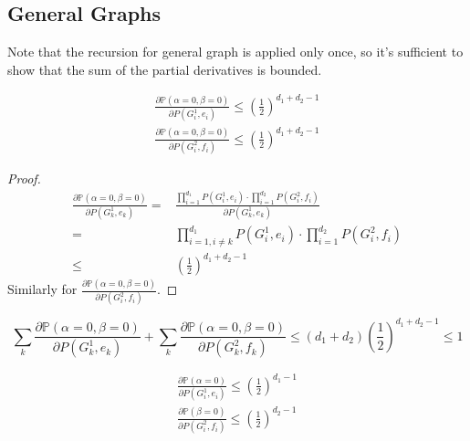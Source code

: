 	\subsection{General Graphs}

	Note that the recursion for general graph is applied only once, so it's sufficient to show that the sum of the partial derivatives is bounded.

	\begin{Prop}
		\begin{align*}
			\frac{\partial \mathbb{P}\left( \alpha = 0, \beta = 0 \right) }{ \partial P(G_i^1, e_i) } \leq (\frac{1}{2})^{d_1 + d_2 -1} \\
			\frac{\partial \mathbb{P}\left( \alpha = 0, \beta = 0 \right) }{ \partial P(G_i^2, f_i) } \leq (\frac{1}{2})^{d_1 + d_2 -1} 
		\end{align*}
	\end{Prop}
	\begin{proof}
		\begin{align*}
			\frac{\partial \mathbb{P}\left( \alpha = 0, \beta = 0 \right) }{ \partial P(G_k^1, e_k) } = &\frac{\prod_{i=1}^{d_1} P(G_i^1, e_i) \cdot \prod_{i=1}^{d_2} P(G_i^2, f_i) }{\partial P(G_k^1, e_k)} \\
			=&\prod_{i=1,i\neq k}^{d_1} P(G_i^1, e_i) \cdot \prod_{i=1}^{d_2} P(G_i^2, f_i)\\
			\leq & (\frac{1}{2})^{d_1 + d_2 -1}
		\end{align*}
		Similarly for $\frac{\partial \mathbb{P}\left( \alpha = 0, \beta = 0 \right) }{ \partial P(G_i^2, f_i) }$.
	\end{proof}

	\begin{Cor}
		\[\sum_k \frac{\partial \mathbb{P}\left( \alpha = 0, \beta = 0 \right) }{ \partial P(G_k^1, e_k) } + \sum_k \frac{\partial \mathbb{P}\left( \alpha = 0, \beta = 0 \right) }{ \partial P(G_k^2, f_k) } \leq (d_1 + d_2) (\frac{1}{2})^{d_1+d_2-1} \leq 1\]
	\end{Cor}

	\begin{Prop}
		\begin{align*}
			\frac{\partial \mathbb{P}\left( \alpha = 0 \right) }{ \partial P(G_i^1, e_i) } \leq (\frac{1}{2})^{d_1 -1} \\
			\frac{\partial \mathbb{P}\left( \beta = 0 \right) }{ \partial P(G_i^2, f_i) } \leq (\frac{1}{2})^{d_2 -1} 
		\end{align*}
	\end{Prop}

